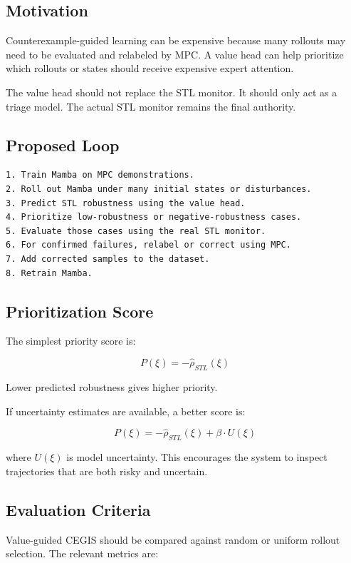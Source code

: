 \documentclass[11pt]{article}
\begin{document}
\subsection{Motivation}

Counterexample-guided learning can be expensive because many rollouts may need to be evaluated and relabeled by MPC. A value head can help prioritize which rollouts or states should receive expensive expert attention.

The value head should not replace the STL monitor. It should only act as a triage model. The actual STL monitor remains the final authority.

\subsection{Proposed Loop}

\begin{lstlisting}
1. Train Mamba on MPC demonstrations.
2. Roll out Mamba under many initial states or disturbances.
3. Predict STL robustness using the value head.
4. Prioritize low-robustness or negative-robustness cases.
5. Evaluate those cases using the real STL monitor.
6. For confirmed failures, relabel or correct using MPC.
7. Add corrected samples to the dataset.
8. Retrain Mamba.
\end{lstlisting}

\subsection{Prioritization Score}

The simplest priority score is:

\[
P(\xi) = -\hat{\rho}_{STL}(\xi)
\]

Lower predicted robustness gives higher priority.

If uncertainty estimates are available, a better score is:

\[
P(\xi)
=
-\hat{\rho}_{STL}(\xi)
+
\beta \cdot U(\xi)
\]

where \(U(\xi)\) is model uncertainty. This encourages the system to inspect trajectories that are both risky and uncertain.

\subsection{Evaluation Criteria}

Value-guided CEGIS should be compared against random or uniform rollout selection. The relevant metrics are:
\end{document}

